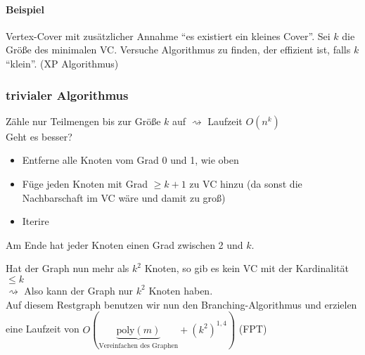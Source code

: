 \paragraph{Beispiel}
Vertex-Cover mit zusätzlicher Annahme "`es existiert ein kleines Cover"'. Sei $k$ die Größe des minimalen VC. Versuche Algorithmus zu finden, der effizient ist, falls $k$ "`klein"'. (XP Algorithmus)
\subsubsection{trivialer Algorithmus}
Zähle nur Teilmengen bis zur Größe $k$ auf $\rightsquigarrow$ Laufzeit $O(n^k)$\\
Geht es besser?\\
\begin{itemize}
	\item Entferne alle Knoten vom Grad 0 und 1, wie oben
	\item Füge jeden Knoten mit Grad $\geq k+1$ zu VC hinzu (da sonst die Nachbarschaft im VC wäre und damit zu groß)
	\item Iterire
\end{itemize}
\begin{figure}[H]
\end{figure}
Am Ende hat jeder Knoten einen Grad zwischen 2 und $k$.\\
\begin{figure}[H]
	\end{figure}
Hat der Graph nun mehr als $k^2$ Knoten, so gib es kein VC mit der Kardinalität $\leq k$\\
$\rightsquigarrow$ Also kann der Graph nur $k^2$ Knoten haben.\\
Auf diesem Restgraph benutzen wir nun den Branching-Algorithmus und erzielen eine Laufzeit von $O(\underset{\text{Vereinfachen des Graphen}}{\underbrace{\text{poly}(m)}} + \left( k^2 \right)^{1,4} )$ (FPT)

